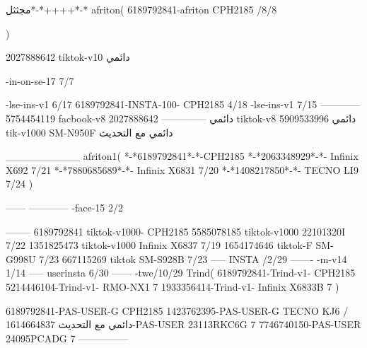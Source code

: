 مجثثل*-*++++*-*
afriton(
6189792841-afriton CPH2185  /8/8

)

2027888642 tiktok-v10
دائمي

-in-on-se-17 7/7

-lse-ins-v1 6/17
6189792841-INSTA-100- CPH2185 4/18
-lse-ins-v1 7/15
------------
5754454119 facbook-v8
دائمي
--------------
2027888642 tiktok-v8
دائمي
5909533996 tik-v1000  SM-N950F
دائمي مع التحديث

__________
afriton1(
*-*6189792841*-*-CPH2185
*-*2063348929*-*-  Infinix X692  7/21
*-*7880685689*-*-   Infinix X6831  7/20
*-*1408217850*-*-   TECNO LI9  7/24
)


------
------------
-face-15 2/2

--------
6189792841 tiktok-v1000- CPH2185 
5585078185 tiktok-v1000 22101320I  7/22
1351825473 tiktok-v1000 Infinix X6837  7/19
1654174646 tiktok-F SM-G998U  7/23
667115269 tiktok SM-S928B  7/23
-----
 INSTA /2/29
-------
-m-v14 1/14
-----
userinsta 6/30
------
-twe/10/29
Trind(
6189792841-Trind-v1- CPH2185 
5214446104-Trind-v1- RMO-NX1 7
1933356414-Trind-v1- Infinix X6833B 7
)


6189792841-PAS-USER-G CPH2185 
1423762395-PAS-USER-G TECNO KJ6  /دائمي مع التحديث
1614664837-PAS-USER 23113RKC6G 7
7746740150-PAS-USER 24095PCADG 7
    ---------------

